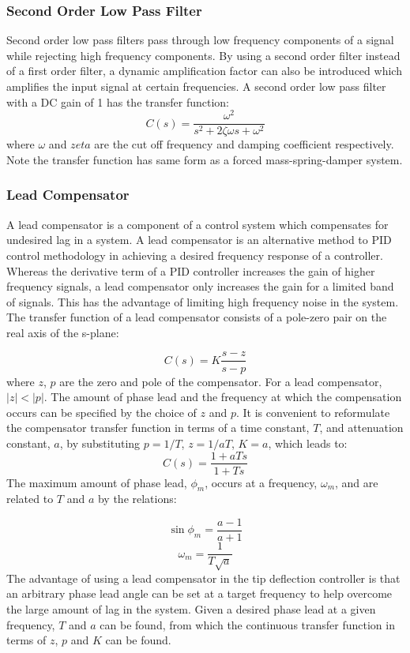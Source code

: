 \subsubsection{Second Order Low Pass Filter}
Second order low pass filters pass through low frequency components of a signal while rejecting high frequency components. By using a second order filter instead of a first order filter, a dynamic amplification factor can also be introduced which amplifies the input signal at certain frequencies. A second order low pass filter with a DC gain of 1 has the transfer function:
$$C(s) = \frac{\omega^2}{s^2 + 2\zeta\omega s + \omega^2}$$
where $\omega$ and $zeta$ are the cut off frequency and damping coefficient respectively. Note the transfer function has same form as a forced mass-spring-damper system.
\subsubsection{Lead Compensator}
A lead compensator is a component of a control system which compensates for undesired lag in a system. A lead compensator is an alternative method to PID control methodology in achieving a desired frequency response of a controller. Whereas the derivative term of a PID controller increases the gain of higher frequency signals, a lead compensator only increases the gain for a limited band of signals. This has the advantage of limiting high frequency noise in the system. The transfer function of a lead compensator consists of a pole-zero pair on the real axis of the s-plane:

$$C(s) = K\frac{s-z}{s-p}$$
where $z$, $p$ are the zero and pole of the compensator. For a lead compensator, $|z| < |p|$. The amount of phase lead and the frequency at which the compensation occurs can be specified by the choice of $z$ and $p$. It is convenient to reformulate the compensator transfer function in terms of a time constant, $T$, and attenuation constant, $a$, by substituting $p = 1/T$, $z = 1/aT$, $K=a$, which leads to:
$$C(s) = \frac{1+aTs}{1+Ts}$$
The maximum amount of phase lead, $\phi_m$, occurs at a frequency, $\omega_m$, and are related to $T$ and $a$ by the relations:

$$\sin\phi_m = \frac{a-1}{a+1}$$
$$\omega_m = \frac{1}{T\sqrt{a}}$$
The advantage of using a lead compensator in the tip deflection controller is that an arbitrary phase lead angle can be set at a target frequency to help overcome the large amount of lag in the system. Given a desired phase lead at a given frequency, $T$ and $a$ can be found, from which the continuous transfer function in terms of $z$, $p$ and $K$ can be found. 
